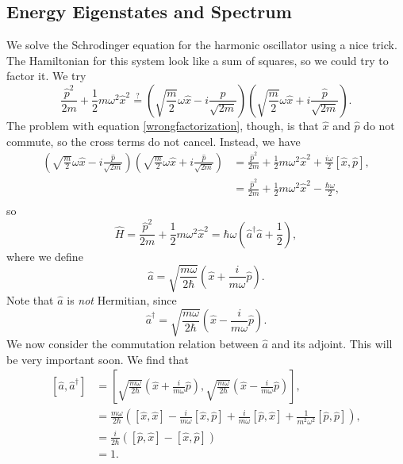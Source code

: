 \subsection{Energy Eigenstates and Spectrum}
We solve the Schrodinger equation for the harmonic oscillator using a nice trick. The Hamiltonian for this system look like a sum of squares, so we could try to factor it. We try
\begin{equation}
\frac{\hat{p}^2}{2m} + \frac{1}{2} m \omega^2 \hat{x}^2 \stackrel{?}{=} \left(\sqrt{\frac{m}{2}} \omega \hat{x}-i \frac{\hat{p}}{\sqrt{2m}}  \right)\left(\sqrt{\frac{m}{2}} \omega \hat{x} +  i \frac{\hat{p}}{\sqrt{2m}}  \right). \label{wrongfactorization} 
\end{equation}
The problem with equation \ref{wrongfactorization}, though, is that $\hat{x}$ and $\hat{p}$ do not commute, so the cross terms do not cancel. Instead, we have
\begin{align*}
\left(\sqrt{\frac{m}{2}} \omega \hat{x}-i \frac{\hat{p}}{\sqrt{2m}}  \right)\left(\sqrt{\frac{m}{2}} \omega \hat{x} +  i \frac{\hat{p}}{\sqrt{2m}}  \right) &=  \frac{\hat{p}^2}{2m} + \frac{1}{2} m \omega^2 \hat{x}^2 + \frac{i\omega}{2} [\hat{x}, \hat{p}],  \\
&= \frac{\hat{p}^2}{2m} + \frac{1}{2} m \omega^2 \hat{x}^2 - \frac{ \hbar \omega}{2},\\
\end{align*}
so
\begin{equation}
\hat{H} =  \frac{\hat{p}^2}{2m} + \frac{1}{2} m \omega^2 \hat{x}^2 =  \hbar \omega \left(\hat{a}^\dagger \hat{a}  + \frac{1}{2}\right), \label{factoredSHOH} 
\end{equation}
where we define 
\begin{equation}
\hat{a} = \sqrt{\frac{m\omega}{2\hbar}} \left(\hat{x} + \frac{i}{m\omega} \hat{p} \right) \label{aSHO}.
\end{equation}
Note that $\hat{a}$ is \textit{not} Hermitian, since 
\begin{equation}
\hat{a}^\dagger = \sqrt{\frac{m\omega}{2\hbar}} \left(\hat{x} - \frac{i}{m\omega} \hat{p} \right) \label{aconjSHO}.
\end{equation}
We now consider the commutation relation between $\hat{a}$ and its adjoint. This will be very important soon. We find that 
\begin{align}
\left[\hat{a}, \hat{a}^\dagger\right] &= \left[\sqrt{\frac{m\omega}{2\hbar}} \left(\hat{x} + \frac{i}{m\omega} \hat{p} \right),  \sqrt{\frac{m\omega}{2\hbar}} \left(\hat{x} - \frac{i}{m\omega} \hat{p} \right) \right],\nonumber\\
&= \frac{m\omega}{2\hbar} \left( \left[\hat{x},\hat{x}\right] - \frac{i}{m\omega} \left[\hat{x},\hat{p}\right] + \frac{i}{m\omega} \left[\hat{p},\hat{x}\right] + \frac{1}{m^2 \omega^2} \left[\hat{p}, \hat{p} \right] \right),\nonumber\\
&= \frac{i}{2\hbar} \left([\hat{p},\hat{x}]-[\hat{x},\hat{p}] \right)\nonumber\\
&= 1\label{aSHOcommutation}.
\end{align}
